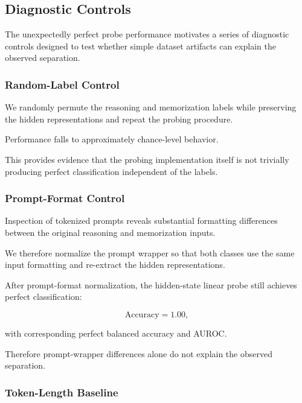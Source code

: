 \documentclass[11pt]{article}
\begin{document}
\subsection{Diagnostic Controls}

The unexpectedly perfect probe performance motivates a series of
diagnostic controls designed to test whether simple dataset artifacts
can explain the observed separation.


\subsubsection{Random-Label Control}

We randomly permute the reasoning and memorization labels while
preserving the hidden representations and repeat the probing
procedure.

Performance falls to approximately chance-level behavior.

This provides evidence that the probing implementation itself is not
trivially producing perfect classification independent of the labels.


\subsubsection{Prompt-Format Control}

Inspection of tokenized prompts reveals substantial formatting
differences between the original reasoning and memorization inputs.

We therefore normalize the prompt wrapper so that both classes use the
same input formatting and re-extract the hidden representations.

After prompt-format normalization, the hidden-state linear probe still
achieves perfect classification:

\[
\mathrm{Accuracy}=1.00,
\]

with corresponding perfect balanced accuracy and AUROC.

Therefore prompt-wrapper differences alone do not explain the
observed separation.


\subsubsection{Token-Length Baseline}
\end{document}
